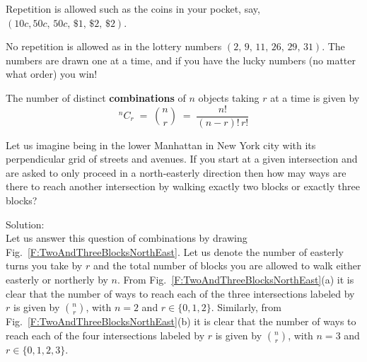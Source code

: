 \be
\item Repetition is allowed  such as the  coins in your pocket, say, $(10c, 50c,\, 50c, \, \$1,\, \$2, \,\$2)$.
\item  No repetition is allowed as  in the  lottery numbers $(2,\,9,\,11,\,26,\,29,\,31)$.  The numbers are drawn one at a time,
and if you have the lucky numbers (no matter what order) you win!
\ee

\begin{framed}The number of distinct {\bf combinations}  of $n$ objects taking
$r$ at a time is given by
\[^nC_r\;=\;\binom{n}{r} \;=\; \frac{n!}{(n-r)!\,r!}\]
\end{framed}

\begin{example}
Let us imagine being in the lower Manhattan in New York city with its perpendicular grid of streets and avenues.
If you start at a given intersection and are asked to only proceed in a north-easterly direction then how may ways are there
to reach another intersection by walking exactly two blocks or exactly three blocks?

Solution:\\
Let us answer this question of combinations by drawing Fig.~\ref{F:TwoAndThreeBlocksNorthEast}.
Let us denote the number of easterly turns you take by $r$ and the total number of blocks you are allowed to walk either easterly or northerly by $n$.
From Fig.~\ref{F:TwoAndThreeBlocksNorthEast}(a) it is clear that the number of ways to reach each of the three intersections labeled by $r$ is given by $\binom{n}{r}$,
with $n=2$ and $r \in \{0,1,2\}$.
Similarly, from Fig.~\ref{F:TwoAndThreeBlocksNorthEast}(b) it is clear that the number of ways to reach each of the four intersections labeled by $r$ is given by $\binom{n}{r}$, with $n=3$ and $r \in \{0,1,2,3\}$.
\end{example}

